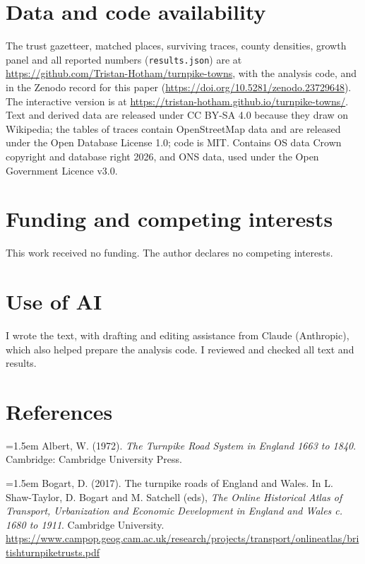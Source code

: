 \documentclass[11pt,a4paper]{article}
\begin{document}
\section*{Data and code availability}

The trust gazetteer, matched places, surviving traces, county densities, growth panel and all reported numbers (\texttt{results.json}) are at \url{https://github.com/Tristan-Hotham/turnpike-towns}, with the analysis code, and in the Zenodo record for this paper (\url{https://doi.org/10.5281/zenodo.23729648}). The interactive version is at \url{https://tristan-hotham.github.io/turnpike-towns/}. Text and derived data are released under CC BY-SA 4.0 because they draw on Wikipedia; the tables of traces contain OpenStreetMap data and are released under the Open Database License 1.0; code is MIT. Contains OS data \textcopyright{} Crown copyright and database right 2026, and ONS data, used under the Open Government Licence v3.0.

\section*{Funding and competing interests}

This work received no funding. The author declares no competing interests.

\section*{Use of AI}

I wrote the text, with drafting and editing assistance from Claude (Anthropic), which also helped prepare the analysis code. I reviewed and checked all text and results.

\section*{References}
\small
\setlength{\parskip}{0.35em}
\hangindent=1.5em Albert, W. (1972). \textit{The Turnpike Road System in England 1663 to 1840}. Cambridge: Cambridge University Press.

\hangindent=1.5em Bogart, D. (2017). The turnpike roads of England and Wales. In L. Shaw-Taylor, D. Bogart and M. Satchell (eds), \textit{The Online Historical Atlas of Transport, Urbanization and Economic Development in England and Wales c. 1680 to 1911}. Cambridge University. \url{https://www.campop.geog.cam.ac.uk/research/projects/transport/onlineatlas/britishturnpiketrusts.pdf}
\end{document}
